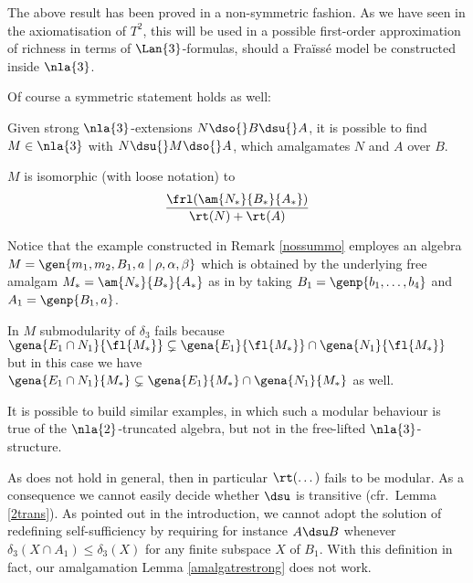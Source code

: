 The above result has been proved in a non-symmetric fashion. As we have seen in the axiomatisation
of $T^{2}$, this will be used in a possible first-order approximation of richness in terms of $\Lan{3}$-formulas, should
a Fra\"iss\'e model be constructed inside $\nla{3}$.

Of course a symmetric statement holds as well:
\begin{cor}
Given strong $\nla{3}$-extensions $N\dso{}B\dsu{}A$, it is possible to find $M\in\nla{3}$ with $N\dsu{}M\dso{}A$, which
amalgamates $N$ and $A$ over $B$.

$M$ is isomorphic (with loose notation) to
$$\frac{\frl(\am{N_{*}}{B_{*}}{A_{*}})}{\rt(N)+\rt(A)}$$
\end{cor}



\bigskip
Notice that the example constructed in Remark \ref{nossummo} employes an algebra $M=\gen{m_{1},m_{2},B_{1},a\mid
\rho,\alpha,\beta}$ which is obtained by the underlying free amalgam $M_{*}=\am{N_{*}}{B_{*}}{A_{*}}$ as in  by
taking $B_{1}=\genp{b_{1},\dots,b_{4}}$ and $A_{1}=\genp{B_{1},a}$.

In $M$ submodularity of $\delta_{3}$ fails because $\gena{E_{1}\cap N_{1}}{\fl{M_{*}}}\subsetneq\gena{E_{1}}{\fl{M_{*}}}\cap\gena{N_{1}}{\fl{M_{*}}}$ but in this case we have $\gena{E_{1}\cap N_{1}}{{M_{*}}}\subsetneq\gena{E_{1}}{{M_{*}}}\cap\gena{N_{1}}{{M_{*}}}$ as well.

It is possible to build similar examples, in which such a modular behaviour is true of the $\nla{2}$-truncated algebra, but not
in the free-lifted $\nla{3}$-structure.  

As  does not hold in general, then in particular $\rt(\dots)$ fails to be modular. As a consequence
we cannot easily decide whether $\dsu$ is transitive (cfr.~Lemma \ref{2trans}).
As pointed out in the introduction, we cannot adopt the solution of redefining self-sufficiency
by requiring for instance $A\dsu B$ whenever $\delta_{3}(X\cap A_{1})\leq\delta_{3}(X)$ for
any finite subspace $X$ of $B_{1}$. With this definition in fact, our amalgamation Lemma \ref{amalgatrestrong}
does not work.

